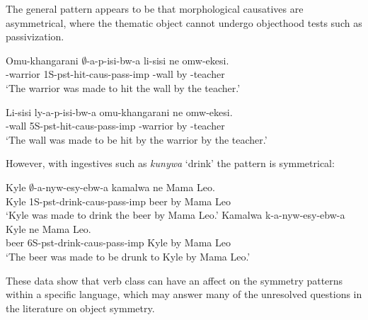\documentclass[output=paper]{langsci/langscibook}
\begin{document}
  The general pattern appears to be that morphological causatives are asymmetrical, where the thematic object cannot undergo objecthood tests such as passivization.
 
  
 \begin{exe}
%
\ex\label{anything2}
\begin{xlist}
\ex\gll Omu-khangarani $\emptyset$-a-p-isi-bw-a li-sisi ne omw-ekesi.\\
	{-}warrior {\sc 1S-pst-}hit-{\sc caus-pass-imp} {-}wall by {}-teacher\\
	\glt `The warrior was made to hit the wall by the teacher.'

\ex \gll {\bad}Li-sisi ly-a-p-isi-bw-a omu-khangarani ne omw-ekesi.\\
		{}-wall {\sc 5S-pst}-hit-{\sc caus-pass-imp} {-}warrior by {-}teacher\\
		\glt `The wall was made to be hit by the warrior by the teacher.'
		

\end{xlist}
\end{exe}
%
 However, with ingestives such as \emph{kunywa} `drink' the pattern is
symmetrical:
%
\begin{exe}
\ex\label{beer}\begin{xlist}
\ex\gll Kyle $\emptyset$-a-nyw-esy-ebw-a kamalwa ne Mama Leo.\\
		Kyle {\sc 1S-pst-}drink-{\sc caus-pass-imp} beer by Mama Leo\\
		\glt `Kyle was made to drink the beer by Mama Leo.'
\ex\gll Kamalwa k-a-nyw-esy-ebw-a Kyle ne Mama Leo.\\
			beer {\sc 6S-pst-}drink-{\sc caus-pass-imp} Kyle by Mama Leo\\
			\glt `The beer was made to be drunk to Kyle by Mama Leo.'
\end{xlist}
\end{exe}

 These data show that verb class can have an affect on the symmetry patterns within a specific language, which may answer many of the unresolved questions in the literature on object symmetry. 

\fi
  

 
 
\iffalse 
appl constraint: 
if $\beta$ is the sum of the lexical entailments of the arguments \{x_1 ... x_n\} of a verb, and $\phi$ = $\alpha$($\beta$), $\phi$ = 1 iff $\phi \noteq \beta$ and 
\fi 
\end{document}
